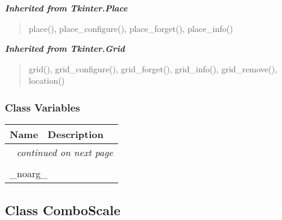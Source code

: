 \large{\textbf{\textit{Inherited from Tkinter.Place}}}

\begin{quote}
place(), place\_configure(), place\_forget(), place\_info()
\end{quote}

\large{\textbf{\textit{Inherited from Tkinter.Grid}}}

\begin{quote}
grid(), grid\_configure(), grid\_forget(), grid\_info(), grid\_remove(), location()
\end{quote}


  \subsubsection{Class Variables}

    \vspace{-1cm}
\hspace{\varindent}\begin{longtable}{|p{\varnamewidth}|p{\vardescrwidth}|l}
\cline{1-2}
\cline{1-2} \centering \textbf{Name} & \centering \textbf{Description}& \\
\cline{1-2}
\endhead\cline{1-2}\multicolumn{3}{r}{\small\textit{continued on next page}}\\\endfoot\cline{1-2}
\endlastfoot\multicolumn{2}{|l|}{\textit{Inherited from Tkinter.Misc}}\\
\multicolumn{2}{|p{\varwidth}|}{\raggedright \_noarg\_}\\
\cline{1-2}
\end{longtable}



\subsection{Class ComboScale}

